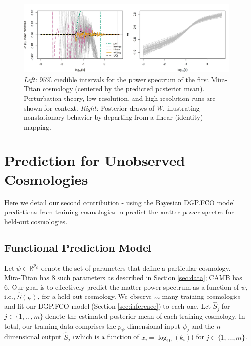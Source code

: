 \documentclass[11pt]{article}
\begin{document}
\begin{figure}[ht]
    \centering
    \includegraphics[width=\textwidth]{plot_fit.jpeg}
    \caption{{\it Left:} 95\% credible intervals for the power spectrum of the first Mira-Titan
    cosmology (centered by the predicted posterior mean). Perturbation theory, 
    low-resolution, and high-resolution runs are shown for context. {\it Right:} Posterior draws
    of $W$, illustrating nonstationary behavior by departing from a linear (identity) mapping.}
    \label{fig:plot_fit}
\end{figure}

\section{Prediction for Unobserved Cosmologies}
\label{sec:pred}

Here we detail our second contribution - using the Bayesian DGP.FCO model predictions
from training cosmologies to predict the matter power spectra for held-out cosmologies. 

\subsection{Functional Prediction Model}
\label{subsec:pca}

Let $\psi \in \mathbb{R}^{p_\psi}$ denote the set of parameters that define a particular cosmology.
Mira-Titan has 8 such parameters as described in Section \ref{sec:data}; CAMB has 6.
Our goal is to effectively predict the matter power spectrum as a function of $\psi$, i.e., $\hat{S}(\psi)$, 
for a held-out cosmology.  We observe $m$-many training cosmologies and fit our DGP.FCO 
model (Section \ref{sec:inference}) to each one.  Let $\hat{S}_j$ for $j \in \{1,\ldots,m\}$ denote
the estimated posterior mean of each training cosmology.  In total, our training data comprises
the $p_\psi$-dimensional input $\psi_j$ and the $n$-dimensional output $\hat{S}_j$ (which is a 
function of $x_i = \log_{10}(k_i)$) for $j \in \{1,\ldots,m\}$.
\end{document}
